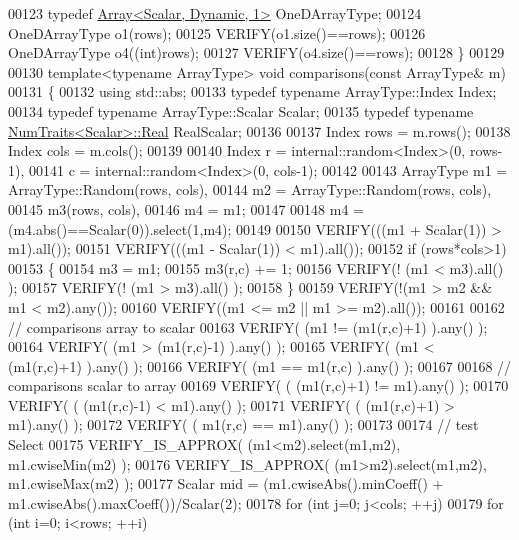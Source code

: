 \begin{DoxyCode}
00123   \textcolor{keyword}{typedef} \hyperlink{group___core___module_class_eigen_1_1_array}{Array<Scalar, Dynamic, 1>} OneDArrayType;
00124   OneDArrayType o1(rows);
00125   VERIFY(o1.size()==rows);
00126   OneDArrayType o4((\textcolor{keywordtype}{int})rows);
00127   VERIFY(o4.size()==rows);
00128 \}
00129 
00130 \textcolor{keyword}{template}<\textcolor{keyword}{typename} ArrayType> \textcolor{keywordtype}{void} comparisons(\textcolor{keyword}{const} ArrayType& m)
00131 \{
00132   \textcolor{keyword}{using} std::abs;
00133   \textcolor{keyword}{typedef} \textcolor{keyword}{typename} ArrayType::Index Index;
00134   \textcolor{keyword}{typedef} \textcolor{keyword}{typename} ArrayType::Scalar Scalar;
00135   \textcolor{keyword}{typedef} \textcolor{keyword}{typename} \hyperlink{group___core___module_struct_eigen_1_1_num_traits}{NumTraits<Scalar>::Real} RealScalar;
00136 
00137   Index rows = m.rows();
00138   Index cols = m.cols();
00139 
00140   Index r = internal::random<Index>(0, rows-1),
00141         c = internal::random<Index>(0, cols-1);
00142 
00143   ArrayType m1 = ArrayType::Random(rows, cols),
00144             m2 = ArrayType::Random(rows, cols),
00145             m3(rows, cols),
00146             m4 = m1;
00147   
00148   m4 = (m4.abs()==Scalar(0)).select(1,m4);
00149 
00150   VERIFY(((m1 + Scalar(1)) > m1).all());
00151   VERIFY(((m1 - Scalar(1)) < m1).all());
00152   \textcolor{keywordflow}{if} (rows*cols>1)
00153   \{
00154     m3 = m1;
00155     m3(r,c) += 1;
00156     VERIFY(! (m1 < m3).all() );
00157     VERIFY(! (m1 > m3).all() );
00158   \}
00159   VERIFY(!(m1 > m2 && m1 < m2).any());
00160   VERIFY((m1 <= m2 || m1 >= m2).all());
00161 
00162   \textcolor{comment}{// comparisons array to scalar}
00163   VERIFY( (m1 != (m1(r,c)+1) ).any() );
00164   VERIFY( (m1 >  (m1(r,c)-1) ).any() );
00165   VERIFY( (m1 <  (m1(r,c)+1) ).any() );
00166   VERIFY( (m1 ==  m1(r,c)    ).any() );
00167 
00168   \textcolor{comment}{// comparisons scalar to array}
00169   VERIFY( ( (m1(r,c)+1) != m1).any() );
00170   VERIFY( ( (m1(r,c)-1) <  m1).any() );
00171   VERIFY( ( (m1(r,c)+1) >  m1).any() );
00172   VERIFY( (  m1(r,c)    == m1).any() );
00173 
00174   \textcolor{comment}{// test Select}
00175   VERIFY\_IS\_APPROX( (m1<m2).select(m1,m2), m1.cwiseMin(m2) );
00176   VERIFY\_IS\_APPROX( (m1>m2).select(m1,m2), m1.cwiseMax(m2) );
00177   Scalar mid = (m1.cwiseAbs().minCoeff() + m1.cwiseAbs().maxCoeff())/Scalar(2);
00178   \textcolor{keywordflow}{for} (\textcolor{keywordtype}{int} j=0; j<cols; ++j)
00179   \textcolor{keywordflow}{for} (\textcolor{keywordtype}{int} i=0; i<rows; ++i)

\end{DoxyCode}
